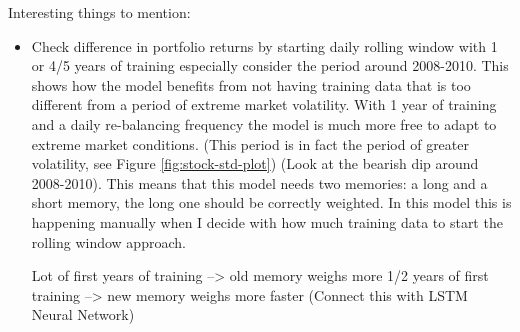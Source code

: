 Interesting things to mention:
\begin{itemize}
	\item Check difference in portfolio returns by starting daily rolling window with 1 or 4/5 years of training especially consider the period around 2008-2010. This shows how the model benefits from not having training data that is too different from a period of extreme market volatility. With 1 year of training and a daily re-balancing frequency the model is much more free to adapt to extreme market conditions. (This period is in fact the period of greater volatility, see Figure \ref{fig:stock-std-plot})
	(Look at the bearish dip around 2008-2010). This means that this model needs two memories: a long and a short memory, the long one should be correctly weighted. In this model this is happening manually when I decide with how much training data to start the rolling window approach.
	
	Lot of first years of training --> old memory weighs more
	1/2 years of first training --> new memory weighs more faster
	(Connect this with LSTM Neural Network)
\end{itemize}